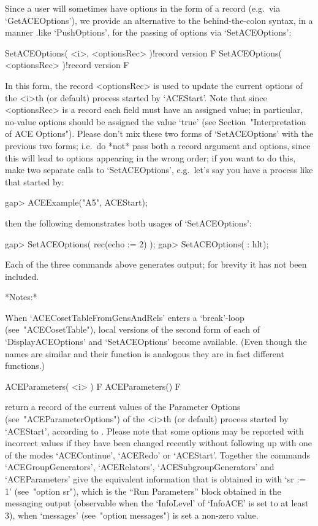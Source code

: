 Since  a  user  will   sometimes have options in the form  of a record 
(e.g.~via `GetACEOptions'),   we    provide  an  alternative  to   the
behind-the-colon  syntax,  in a  manner .like  `PushOptions', for  the
passing of options via `SetACEOptions':

\>SetACEOptions( <i>, <optionsRec> )!{record version} F
\>SetACEOptions( <optionsRec> )!{record version} F

In this form, the record <optionsRec> is used to  update  the  current
options of the <i>th (or default) process started by `ACEStart'.  Note
that since <optionsRec> is a record each field must have  an  assigned
value; in particular, no-value {\ACE} options should be  assigned  the
value `true' (see Section~"Interpretation  of  ACE  Options").  Please
don't mix these two forms of `SetACEOptions'  with  the  previous  two
forms; i.e.~do *not* pass both a record argument  and  options,  since
this will lead to options appearing in the wrong order; if you want to
do this, make two separate calls to  `SetACEOptions',  e.g.~let's  say
you have a process like that started by:

\beginexample
gap> ACEExample("A5", ACEStart);

\endexample

then the following demonstrates both usages of `SetACEOptions':

\beginexample
gap> SetACEOptions( rec(echo := 2) );
gap> SetACEOptions( : hlt);

\endexample

Each of the three commands above generates output; for brevity it  has
not been included.

*Notes:*

When    `ACECosetTableFromGensAndRels'    enters    a     `break'-loop
(see~"ACECosetTable"), local versions of the second form  of  each  of
`DisplayACEOptions' and `SetACEOptions' become available. (Even though
the names are similar and their function is analogous they are in fact
different functions.)

\>ACEParameters( <i> ) F
\>ACEParameters() F

return a record of the current values of the {\ACE} Parameter  Options
(see~"ACEParameterOptions") of the <i>th (or default) process  started
by `ACEStart', according to {\ACE}. Please note that some options  may
be reported with incorrect values if they have been  changed  recently
without following up with one of the modes `ACEContinue', `ACERedo' or
`ACEStart'. Together the commands `ACEGroupGenerators', `ACERelators',
`ACESubgroupGenerators' and `ACEParameters' give the equivalent {\GAP}
information that is obtained in {\ACE} with  `sr  :=  1'  (see~"option
sr"), which is the ``Run Parameters'' block obtained in the  messaging
output (observable when the `InfoLevel' of  `InfoACE'  is  set  to  at
least 3), when `messages' (see~"option messages") is  set  a  non-zero
value.

